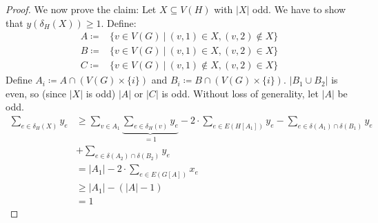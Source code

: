 \documentclass[11pt, a4paper]{article}
\newcommand{\abs}[1]{\left\lvert#1\right\rvert}
\newcommand{\set}[1]{\{#1\}}
\theoremstyle{remark}
\theoremstyle{definition}
\begin{document}
\begin{proof}
	We now prove the claim: Let $X\subseteq V(H)$ with $\abs{X}$ odd. We
	have to show that $y(\delta_H(X))\geq1$. Define:
	\begin{align*}
		A\coloneqq & \set{v\in V(G)\ |\ (v,1)\in X,(v,2)\notin X} \\
		B\coloneqq & \set{v\in V(G)\ |\ (v,1)\in X, (v,2)\in X}   \\
		C\coloneqq & \set{v\in V(G)\ |\ (v,1)\notin X,(v,2)\in X}
	\end{align*}
	Define $A_i\coloneqq A\cap (V(G)\times \set{i})$ and $B_i\coloneqq B\cap
		(V(G)\times \set{i})$. $\abs{B_1\cup B_2}$ is even, so (since $\abs{X}$ is
	odd) $\abs{A}$ or $\abs{C}$ is odd. Without loss of generality, let $\abs{A}$
	be odd.
	\begin{align*}
		\sum_{e\in\delta_H(X)}y_e
		 & \geq \sum_{v\in A_1}\underbrace{\sum_{e\in\delta_H(v)}y_e}_{=1}
		-2\cdot\sum_{e\in E(H[A_1])}y_e-\sum_{e\in \delta(A_1)\cap\delta(B_1)}y_e \\
		 & +\sum_{e\in \delta(A_2)\cap\delta(B_2)}y_e                             \\
		 & =\abs{A_1}-2\cdot\sum_{e\in E(G[A])}x_e                                \\
		 & \geq \abs{A_1}-(\abs{A}-1)                                             \\
		 & =1
	\end{align*}

\end{proof}
\end{document}
